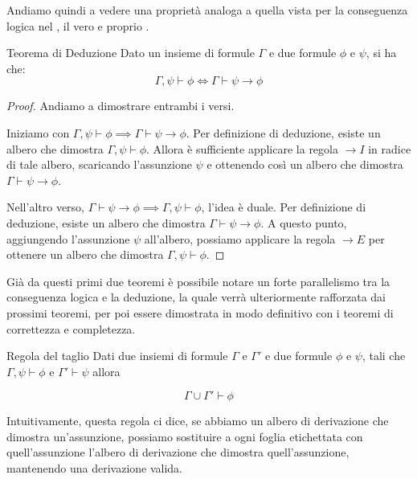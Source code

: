 Andiamo quindi a vedere una proprietà analoga a quella vista per la conseguenza logica nel , il vero e proprio .

\begin{theorem}[namedlabel={thm:deduction}{Teorema di Deduzione}]{Teorema di Deduzione}
  Dato un insieme di formule \(\Gamma\) e due formule \(\phi\) e \(\psi\), si ha che:
  \[\Gamma, \psi \vdash \phi \iff \Gamma \vdash \psi \to \phi\]
\end{theorem}

\begin{proof}
  Andiamo a dimostrare entrambi i versi.
  
  Iniziamo con \(\Gamma, \psi \vdash \phi \implies \Gamma \vdash \psi \to \phi\).
  Per definizione di deduzione, esiste un albero che dimostra \(\Gamma, \psi \vdash \phi\). Allora è sufficiente applicare la regola \(\to I\) in radice di tale albero, scaricando l'assunzione \(\psi\) e ottenendo così un albero che dimostra \(\Gamma \vdash \psi \to \phi\).

  Nell'altro verso, \(\Gamma \vdash \psi \to \phi \implies \Gamma, \psi \vdash \phi\), l'idea è duale.
  Per definizione di deduzione, esiste un albero che dimostra \(\Gamma \vdash \psi \to \phi\). A questo punto, aggiungendo l'assunzione \(\psi\) all'albero, possiamo applicare la regola \(\to E\) per ottenere un albero che dimostra \(\Gamma, \psi \vdash \phi\).
\end{proof}

Già da questi primi due teoremi è possibile notare un forte parallelismo tra la conseguenza logica e la deduzione, la quale verrà ulteriormente rafforzata dai prossimi teoremi, per poi essere dimostrata in modo definitivo con i teoremi di correttezza e completezza.

\begin{theorem}{Regola del taglio}
  Dati due insiemi di formule \(\Gamma\) e \(\Gamma'\) e due formule \(\phi\) e \(\psi\), tali che \(\Gamma, \psi \vdash \phi\) e \(\Gamma' \vdash \psi\) allora
  
  \[\Gamma \cup \Gamma' \vdash \phi\]
\end{theorem}

Intuitivamente, questa regola ci dice, se abbiamo un albero di derivazione che dimostra un'assunzione, possiamo sostituire a ogni foglia etichettata con quell'assunzione l'albero di derivazione che dimostra quell'assunzione, mantenendo una derivazione valida.


